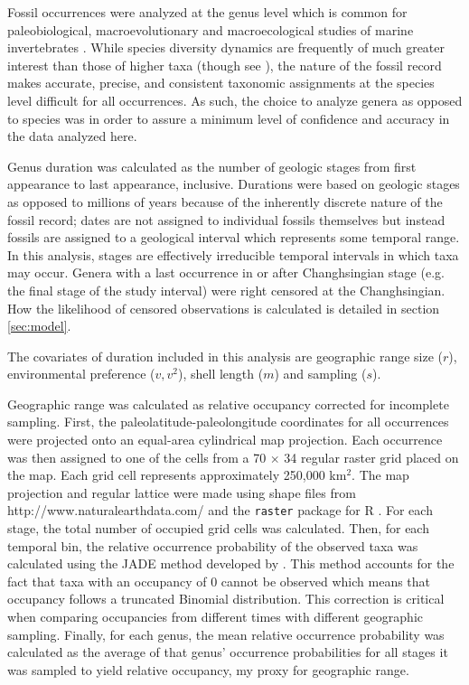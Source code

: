 \documentclass[11pt]{article}
\begin{document}
Fossil occurrences were analyzed at the genus level which is common for paleobiological, macroevolutionary and macroecological studies of marine invertebrates \citep{Alroy2010,Foote2013,Harnik2013,Kiessling2007a,Miller2009a,Nurnberg2013a,Nurnberg2015,Payne2007,Simpson2009,Vilhena2013}. While species diversity dynamics are frequently of much greater interest than those of higher taxa (though see \citealt{Foote2014b,Hoehn2015}), the nature of the fossil record makes accurate, precise, and consistent taxonomic assignments at the species level difficult for all occurrences. As such, the choice to analyze genera as opposed to species was in order to assure a minimum level of confidence and accuracy in the data analyzed here.

Genus duration was calculated as the number of geologic stages from first appearance to last appearance, inclusive. Durations were based on geologic stages as opposed to millions of years because of the inherently discrete nature of the fossil record; dates are not assigned to individual fossils themselves but instead fossils are assigned to a geological interval which represents some temporal range. In this analysis, stages are effectively irreducible temporal intervals in which taxa may occur. Genera with a last occurrence in or after Changhsingian stage (e.g. the final stage of the study interval) were right censored at the Changhsingian. How the likelihood of censored observations is calculated is detailed in section \ref{sec:model}.

The covariates of duration included in this analysis are geographic range size (\(r\)), environmental preference (\(v, v^{2}\)), shell length (\(m\)) and sampling (\(s\)).

Geographic range was calculated as relative occupancy corrected for incomplete sampling. First, the paleolatitude-paleolongitude coordinates for all occurrences were projected onto an equal-area cylindrical map projection. Each occurrence was then assigned to one of the cells from a 70 \(\times\) 34 regular raster grid placed on the map. Each grid cell represents approximately 250,000 km\(^{2}\). The map projection and regular lattice were made using shape files from http://www.naturalearthdata.com/ and the \texttt{raster} package for R \citep{raster}. For each stage, the total number of occupied grid cells was calculated. Then, for each temporal bin, the relative occurrence probability of the observed taxa was calculated using the \uppercase{jade} method developed by \citet{Chao2015a}. This method accounts for the fact that taxa with an occupancy of 0 cannot be observed which means that occupancy follows a truncated Binomial distribution. This correction is critical when comparing occupancies from different times with different geographic sampling. Finally, for each genus, the mean relative occurrence probability was calculated as the average of that genus' occurrence probabilities for all stages it was sampled to yield relative occupancy, my proxy for geographic range.
\end{document}
